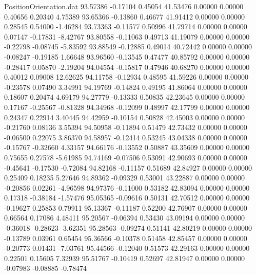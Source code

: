 \begin{filecontents}{PositionOrientation.dat}
  93.57386   -0.17104    0.45054    41.53476    0.00000    0.00000    0.40656    0.20340    4.75389
  93.65366   -0.13860    0.46677    41.91412    0.00000    0.00000    0.28545    0.54000   -1.46284
  93.73363   -0.11577    0.50996    41.79714    0.00000    0.00000    0.07147   -0.17831   -8.42767
  93.80558   -0.11063    0.49713    41.19079    0.00000    0.00000   -0.22798   -0.08745   -5.83592
  93.88549   -0.12885    0.49014    40.72442    0.00000    0.00000   -0.08247   -0.19185    1.66648
  93.96560   -0.13545    0.47477    40.85792    0.00000    0.00000   -0.28417    0.05870   -2.19204
  94.04554   -0.15817    0.47946    40.68270    0.00000    0.00000    0.40012    0.09008   12.62625
  94.11758   -0.12934    0.48595    41.59226    0.00000    0.00000   -0.23578    0.07490    3.34991
  94.19769   -0.14824    0.49195    41.86064    0.00000    0.00000    0.18607    0.20474    4.69179
  94.27779   -0.13333    0.50835    42.23645    0.00000    0.00000    0.17167   -0.25567   -0.81328
  94.34968   -0.12099    0.48997    42.17799    0.00000    0.00000    0.24347    0.22914    3.40445
  94.42959   -0.10154    0.50828    42.45003    0.00000    0.00000   -0.21760    0.08136    3.55394
  94.50958   -0.11894    0.51479    42.73432    0.00000    0.00000   -0.06500    0.22075    3.86370
  94.58957   -0.12414    0.53245    43.04338    0.00000    0.00000   -0.15767   -0.32660    4.33157
  94.66176   -0.13552    0.50887    43.35609    0.00000    0.00000    0.75655    0.27578   -5.61985
  94.74169   -0.07506    0.53091    42.90693    0.00000    0.00000   -0.45641   -0.17530   -0.72084
  94.82168   -0.11157    0.51689    42.84927    0.00000    0.00000    0.25409    0.18235    5.27646
  94.89362   -0.09329    0.53001    43.22887    0.00000    0.00000   -0.20856    0.02261   -4.96598
  94.97376   -0.11000    0.53182    42.83094    0.00000    0.00000    0.17318   -0.38184   -1.57476
  95.05365   -0.09616    0.50131    42.70512    0.00000    0.00000   -0.19627    0.25853    0.79911
  95.13367   -0.11187    0.52200    42.76907    0.00000    0.00000    0.66564    0.17086    4.48411
  95.20567   -0.06394    0.53430    43.09194    0.00000    0.00000   -0.36018   -0.28623   -3.62351
  95.28563   -0.09274    0.51141    42.80219    0.00000    0.00000   -0.13789    0.03961    0.65454
  95.36566   -0.10378    0.51458    42.85457    0.00000    0.00000   -0.20773    0.01431   -7.03761
  95.44566   -0.12040    0.51573    42.29163    0.00000    0.00000    0.22501    0.15605    7.32939
  95.51767   -0.10419    0.52697    42.81947    0.00000    0.00000   -0.07983   -0.08885   -0.78474

\end{filecontents}
